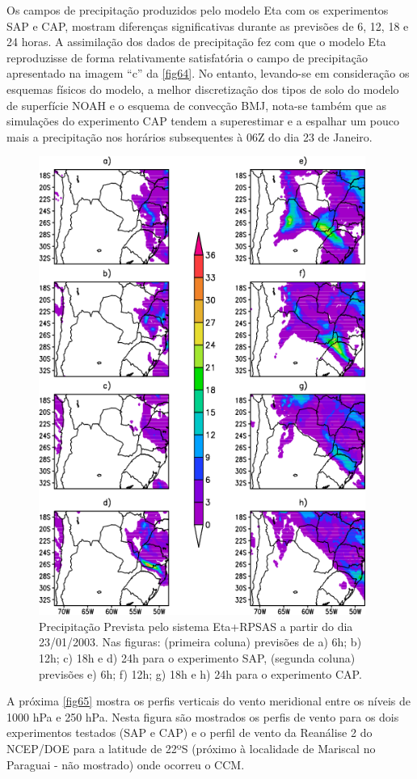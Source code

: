 Os campos de precipitação produzidos pelo modelo Eta com os experimentos SAP e CAP, mostram diferenças significativas durante as previsões de 6, 12, 18 e 24 horas. A assimilação dos dados de precipitação fez com que o modelo Eta reproduzisse de forma relativamente satisfatória o campo de precipitação apresentado na imagem ``c'' da \autoref{fig64}. No entanto, levando-se em consideração os esquemas físicos do modelo,  a melhor discretização dos tipos de solo do modelo de superfície NOAH e o esquema de convecção BMJ, nota-se também que as simulações do experimento CAP tendem a superestimar e a espalhar um pouco mais a precipitação nos horários subsequentes à 06Z do dia 23 de Janeiro.

\begin{figure}[!hpb]
\centering
\includegraphics[height=15cm]{./figs/prec_eta1.png}
\caption{Precipitação Prevista pelo sistema Eta+RPSAS a partir do dia 23/01/2003. Nas figuras: (primeira coluna) previsões de a) 6h; b) 12h; c) 18h e d) 24h para o experimento SAP, (segunda coluna) previsões e) 6h; f) 12h; g) 18h e h) 24h para o experimento CAP.}
\label{fig64}
\end{figure}

A próxima \autoref{fig65} mostra os perfis verticais do vento meridional entre os níveis de 1000 hPa e 250 hPa. Nesta figura são mostrados os perfis de vento para os dois experimentos testados (SAP e CAP) e o perfil de vento da Reanálise 2 do NCEP/DOE para a latitude de 22ºS (próximo à localidade de Mariscal no Paraguai - não mostrado) onde ocorreu o CCM. 

